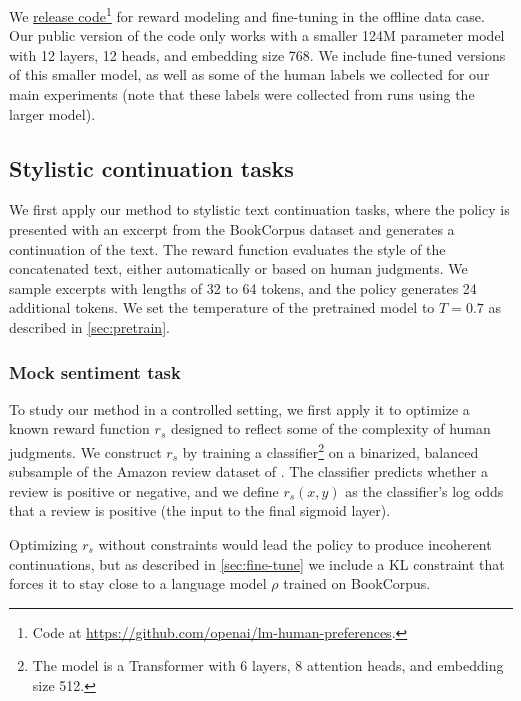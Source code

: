 We \href{https://github.com/openai/lm-human-preferences}{release code}\footnote{Code at \href{https://github.com/openai/lm-human-preferences}{https://github.com/openai/lm-human-preferences}.} for reward modeling and fine-tuning in the offline data case.  Our public version of the code only works with a smaller 124M parameter model with 12 layers, 12 heads, and embedding size 768.  We include fine-tuned versions of this smaller model, as well as some of the human labels we collected for our main experiments (note that these labels were collected from runs using the larger model).

\subsection{Stylistic continuation tasks \label{sec:style-overview}}

We first apply our method to stylistic text continuation tasks, where the policy is presented with an excerpt from the BookCorpus dataset \citep{zhu2015aligning} and generates a continuation of the text. The reward function evaluates the style of the concatenated text, either automatically or based on human judgments. We sample excerpts with lengths of 32 to 64 tokens, and the policy generates 24 additional tokens. We set the temperature of the pretrained model to $T = 0.7$ as described in \ref{sec:pretrain}.

\subsubsection{Mock sentiment task \label{sec:mock}}

To study our method in a controlled setting, we first apply it to optimize a known reward function $r_s$ designed to reflect some of the complexity of human judgments. We construct $r_s$ by training a classifier\footnote{The model is a Transformer with 6 layers, 8 attention heads, and embedding size 512.} on a binarized, balanced subsample of the Amazon review dataset of \citet{mcauley2015image}.
The classifier predicts whether a review is positive or negative, and we define $r_s(x, y)$ as the classifier's log odds that a review is positive (the input to the final sigmoid layer).

Optimizing $r_s$ without constraints would lead the policy to produce incoherent continuations, but as described in \ref{sec:fine-tune} we include a KL constraint that forces it to stay close to a language model $\rho$
trained on BookCorpus.

